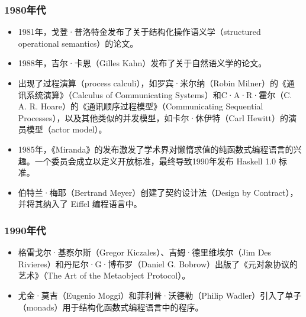 \subsubsection{1980年代}  
\begin{itemize}
\item 1981年，戈登·普洛特金发布了关于结构化操作语义学（structured operational semantics）的论文。  
\item 1988年，吉尔·卡恩（Gilles Kahn）发布了关于自然语义学的论文。  
\item 出现了过程演算（process calculi），如罗宾·米尔纳（Robin Milner）的《通讯系统演算》（Calculus of Communicating Systems）和C·A·R·霍尔（C. A. R. Hoare）的《通讯顺序过程模型》（Communicating Sequential Processes），以及其他类似的并发模型，如卡尔·休伊特（Carl Hewitt）的演员模型（actor model）。  
\item 1985年，《Miranda》的发布激发了学术界对懒惰求值的纯函数式编程语言的兴趣。一个委员会成立以定义开放标准，最终导致1990年发布 Haskell 1.0 标准。  
\item 伯特兰·梅耶（Bertrand Meyer）创建了契约设计法（Design by Contract），并将其纳入了 Eiffel 编程语言中。
\end{itemize}
\subsubsection{1990年代}
\begin{itemize}
\item 格雷戈尔·基察尔斯（Gregor Kiczales）、吉姆·德里维埃尔（Jim Des Rivieres）和丹尼尔·G·博布罗（Daniel G. Bobrow）出版了《元对象协议的艺术》（The Art of the Metaobject Protocol）。  
\item 尤金·莫吉（Eugenio Moggi）和菲利普·沃德勒（Philip Wadler）引入了单子（monads）用于结构化函数式编程语言中的程序。
\end{itemize}